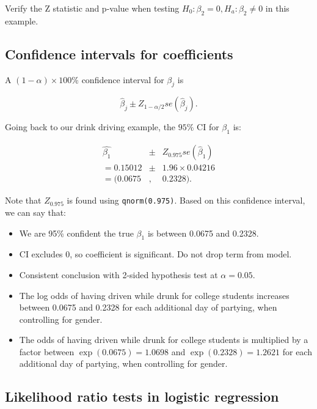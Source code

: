 \documentclass[
]{book}
\providecommand{\tightlist}{%
  \setlength{\itemsep}{0pt}\setlength{\parskip}{0pt}}
\begin{document}
Verify the Z statistic and p-value when testing \(H_0: \beta_2 = 0, H_a: \beta_2 \neq 0\) in this example.

\hypertarget{confidence-intervals-for-coefficients}{%
\subsection{Confidence intervals for coefficients}\label{confidence-intervals-for-coefficients}}

A \((1-\alpha) \times 100\%\) confidence interval for \(\beta_j\) is

\begin{equation} 
\hat{\beta}_j \pm Z_{1- \alpha/2} se(\hat{\beta}_j).
\label{eq:11CI}
\end{equation}

Going back to our drink driving example, the \(95\%\) CI for \(\beta_1\) is:

\begin{eqnarray*}
\hat{\beta_1} &\pm& Z_{0.975} se(\hat{\beta}_1) \nonumber \\
= 0.15012 &\pm& 1.96 \times 0.04216 \nonumber \\
= (0.0675&,& 0.2328). \nonumber
\end{eqnarray*}

Note that \(Z_{0.975}\) is found using \texttt{qnorm(0.975)}. Based on this confidence interval, we can say that:

\begin{itemize}
\tightlist
\item
  We are 95\% confident the true \(\beta_1\) is between 0.0675 and 0.2328.
\item
  CI excludes 0, so coefficient is significant. Do not drop term from model.
\item
  Consistent conclusion with 2-sided hypothesis test at \(\alpha = 0.05\).
\item
  The log odds of having driven while drunk for college students increases between 0.0675 and 0.2328 for each additional day of partying, when controlling for gender.
\item
  The odds of having driven while drunk for college students is multiplied by a factor between \(\exp(0.0675) = 1.0698\) and \(\exp(0.2328) = 1.2621\) for each additional day of partying, when controlling for gender.
\end{itemize}

\hypertarget{likelihood-ratio-tests-in-logistic-regression}{%
\subsection{Likelihood ratio tests in logistic regression}\label{likelihood-ratio-tests-in-logistic-regression}}
\end{document}
